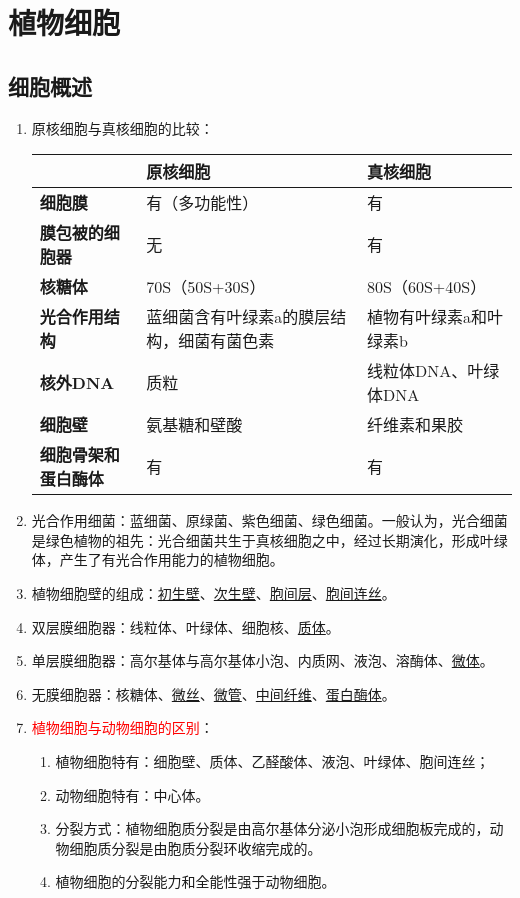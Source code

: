 \chapter{植物细胞}
\section{细胞概述}
\begin{enumerate}
    \item 原核细胞与真核细胞的比较：
    \begin{table}[h]
        \centering
        \begin{tabular}{C{3.4cm}C{3.7cm}C{3.7cm}}
            \toprule
            &\textbf{原核细胞}&\textbf{真核细胞}\\
            \midrule
            \textbf{细胞膜}&有（多功能性）&有\\
            \textbf{膜包被的细胞器}&无&有\\
            \textbf{核糖体}&70S（50S+30S）&80S（60S+40S）\\
            \textbf{光合作用结构}&蓝细菌含有叶绿素a的膜层结构，细菌有菌色素&植物有叶绿素a和叶绿素b\\
            \textbf{核外DNA}&质粒&线粒体DNA、叶绿体DNA\\
            \textbf{细胞壁}&氨基糖和壁酸&纤维素和果胶\\
            \textbf{细胞骨架和蛋白酶体}&有&有\\
            \bottomrule
        \end{tabular}
    \end{table}
    \item 光合作用细菌：蓝细菌、原绿菌、紫色细菌、绿色细菌。一般认为，光合细菌是绿色植物的祖先：光合细菌共生于真核细胞之中，经过长期演化，形成叶绿体，产生了有光合作用能力的植物细胞。
    \item 植物细胞壁的组成：\uline{初生壁}、\uline{次生壁}、\uline{胞间层}、\uline{胞间连丝}。
    \item 双层膜细胞器：线粒体、叶绿体、细胞核、\uline{质体}。
    \item 单层膜细胞器：高尔基体与高尔基体小泡、内质网、液泡、溶酶体、\uline{微体}。
    \item 无膜细胞器：核糖体、\uline{微丝}、\uline{微管}、\uline{中间纤维}、\uline{蛋白酶体}。
    \item \textcolor{red}{植物细胞与动物细胞的区别}：
    \begin{enumerate}
        \item 植物细胞特有：细胞壁、质体、乙醛酸体、液泡、叶绿体、胞间连丝；
        \item 动物细胞特有：中心体。
        \item 分裂方式：植物细胞质分裂是由高尔基体分泌小泡形成细胞板完成的，动物细胞质分裂是由胞质分裂环收缩完成的。
        \item 植物细胞的分裂能力和全能性强于动物细胞。
    \end{enumerate}
\end{enumerate}

